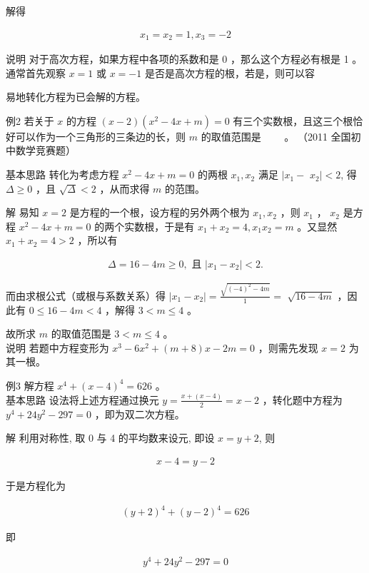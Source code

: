 \documentclass[10pt]{article}
\begin{document}
解得

\begin{align*}
x_{1}=x_{2}=1, x_{3}=-2
\end{align*}

说明 对于高次方程，如果方程中各项的系数和是 0 ，那么这个方程必有根是 1 。通常首先观察 $x=1$ 或 $x=-1$ 是否是高次方程的根，若是，则可以容

易地转化方程为已会解的方程。

例2 若关于 $x$ 的方程 $(x-2)\left(x^{2}-4 x+m\right)=0$ 有三个实数根，且这三个根恰好可以作为一个三角形的三条边的长，则 $m$ 的取值范围是 $\qquad$。 （2011 全国初中数学竞赛题）

基本思路 转化为考虑方程 $x^{2}-4 x+m=0$ 的两根 $x_{1}, x_{2}$ 满足 $\mid x_{1}-$ $x_{2} \mid<2$, 得 $\Delta \geqslant 0$ ，且 $\sqrt{\Delta}<2$ ，从而求得 $m$ 的范围。

解 易知 $x=2$ 是方程的一个根，设方程的另外两个根为 $x_{1}, x_{2}$ ，则 $x_{1}$ ， $x_{2}$ 是方程 $x^{2}-4 x+m=0$ 的两个实数根，于是有 $x_{1}+x_{2}=4, x_{1} x_{2}=m$ 。又显然 $x_{1}+x_{2}=4>2$ ，所以有

\begin{align*}
\Delta=16-4 m \geqslant 0, \text { 且 }\left|x_{1}-x_{2}\right|<2 .
\end{align*}

而由求根公式（或根与系数关系）得 $\left|x_{1}-x_{2}\right|=\frac{\sqrt{(-4)^{2}-4 m}}{1}=$ $\sqrt{16-4 m}$ ，因此有 $0 \leqslant 16-4 m<4$ ，解得 $3<m \leqslant 4$ 。

故所求 $m$ 的取值范围是 $3<m \leqslant 4$ 。\\
说明 若题中方程变形为 $x^{3}-6 x^{2}+(m+8) x-2 m=0$ ，则需先发现 $x=2$ 为其一根。

例3 解方程 $x^{4}+(x-4)^{4}=626$ 。\\
基本思路 设法将上述方程通过换元 $y=\frac{x+(x-4)}{2}=x-2$ ，转化题中方程为 $y^{4}+24 y^{2}-297=0$ ，即为双二次方程。

解 利用对称性, 取 0 与 4 的平均数来设元, 即设 $x=y+2$, 则

\begin{align*}
x-4=y-2
\end{align*}

于是方程化为

\begin{align*}
(y+2)^{4}+(y-2)^{4}=626
\end{align*}

即

\begin{align*}
y^{4}+24 y^{2}-297=0
\end{align*}
\end{document}

